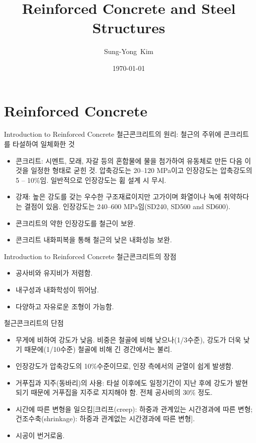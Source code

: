 \documentclass[9pt]{beamer}
\title{Reinforced Concrete and Steel Structures}
\author{Sung-Yong~Kim\inst{1}}
\institute[Changwon National University] %
{
	\inst{1}%
	Associate Professor, School of Architecture\\
	Changwon National University}
\date{\today}
\begin{document}
\begin{frame}
	\titlepage
\end{frame}

\section{Reinforced Concrete}	

\begin{frame}{Introduction to Reinforced Concrete}
철근콘크리트의 원리: 철근의 주위에 콘크리트를 타설하여 일체화한 것
	\begin{itemize}
		\item 콘크리트: 시멘트, 모래, 자갈 등의 혼합물에 물을 첨가하여 유동체로 만든 다음 이것을 일정한 형태로 굳힌 것. 압축강도는 20--120 MPa이고 인장강도는 압축강도의 5 -- 10\%임. 일반적으로 인장강도는 휨 설계 시 무시. 
		\item 강재: 높은 강도를 갖는 우수한 구조재료이지만 고가이며 화열이나 녹에 취약하다는 결점이 있음. 인장강도는 240--600 MPa임(SD240, SD500 and SD600).
		\item 콘크리트의 약한 인장강도를 철근이 보완.
		\item 콘크리트 내화피복을 통해 철근의 낮은 내화성능 보완.
	\end{itemize}
\end{frame}

\begin{frame}{Introduction to Reinforced Concrete}
철근콘크리트의 장점

\begin{itemize}
	\item 공사비와 유지비가 저렴함.
	\item 내구성과 내화학성이 뛰어남.
	\item 다양하고 자유로운 조형이 가능함. 
\end{itemize}

철근콘크리트의 단점

\begin{itemize}
	\item 무게에 비하여 강도가 낮음. 비중은 철골에 비해 낮으나(1/3수준), 강도가 더욱 낮기 때문에(1/10수준) 철골에 비해 긴 경간에서는 불리. 
	\item 인장강도가 압축강도의 10\%수준이므로, 인장 측에서의 균열이 쉽게 발생함. 
	\item 거푸집과 지주(동바리)의 사용: 타설 이후에도 일정기간이 지난 후에 강도가 발현되기 때문에 거푸집을 지주로 지지해야 함. 전체 공사비의 30\% 정도. 
	\item 시간에 따른 변형을 일으킴[크리프(creep): 하중과 관계있는 시간경과에 따른 변형; 건조수축(shrinkage): 하중과 관계없는 시간경과에 따른 변형].
	\item 시공이 번거로움. 
\end{itemize}

\end{frame}
\end{document}
